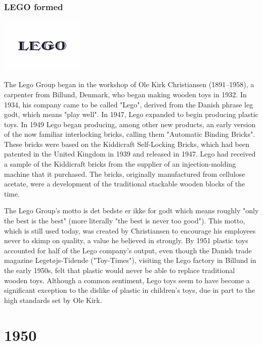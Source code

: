 \documentclass[11pt]{report}
\begin{document}
\section{}
\subsection{LEGO formed}
\vspace{2mm}\begin{center}\includegraphics[width=4cm]{./img/legofirstlogo.jpg}\end{center}
The Lego Group began in the workshop of Ole Kirk Christiansen (1891–1958), a carpenter from Billund, Denmark, who began making wooden toys in 1932. In 1934, his company came to be called "Lego", derived from the Danish phrase leg godt, which means "play well". In 1947, Lego expanded to begin producing plastic toys. In 1949 Lego began producing, among other new products, an early version of the now familiar interlocking bricks, calling them "Automatic Binding Bricks". These bricks were based on the Kiddicraft Self-Locking Bricks, which had been patented in the United Kingdom in 1939 and released in 1947. Lego had received a sample of the Kiddicraft bricks from the supplier of an injection-molding machine that it purchased. The bricks, originally manufactured from cellulose acetate, were a development of the traditional stackable wooden blocks of the time.

The Lego Group's motto is det bedste er ikke for godt which means roughly "only the best is the best" (more literally "the best is never too good"). This motto, which is still used today, was created by Christiansen to encourage his employees never to skimp on quality, a value he believed in strongly. By 1951 plastic toys accounted for half of the Lego company's output, even though the Danish trade magazine Legetøjs-Tidende ("Toy-Times"), visiting the Lego factory in Billund in the early 1950s, felt that plastic would never be able to replace traditional wooden toys. Although a common sentiment, Lego toys seem to have become a significant exception to the dislike of plastic in children's toys, due in part to the high standards set by Ole Kirk.

\chapter{1950}
\end{document}
